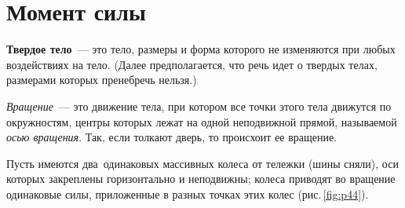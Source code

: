 \documentclass[main.tex]{subfiles}
\begin{document}



\pagestyle{empty}

 

\setcounter{section}{23
}
\addtocounter{section}{-1} 

\section{Момент силы}

\textbf{Твердое тело}~--- это тело, размеры и форма которого не изменяются при любых воздействиях на тело. (Далее предполагается, что речь идет о твердых телах, размерами которых пренебречь нельзя.)

\emph{Вращение}~--- это движение тела, при котором все точки этого тела движутся по окружностям, центры которых лежат на одной неподвижной прямой, называемой \emph{осью вращения}. Так, если толкают дверь, то происхоит ее вращение.

Пусть имеются два~одинаковых массивных колеса от тележки (шины сняли), оси которых закреплены горизонтально и неподвижны; колеса приводят во вращение одинаковые силы, приложенные в разных точках этих колес (рис.\,\ref{fig:p44}).






\end{document}
